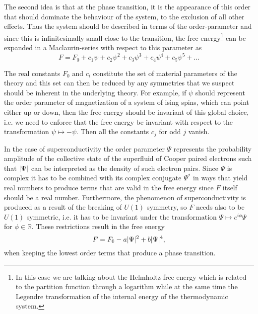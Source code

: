 The second idea is that at the phase transition, it is the appearance of this order that should dominate the behaviour
of the system, to the exclusion of all other effects. Thus the system should be described in terms of the order-parameter
and since this is infinitesimally small close to the transition, the free energy\footnote{In this case we are talking
about the Helmholtz free energy which is related to the partition function through a logarithm while at the same time
the Legendre transformation of the internal energy of the thermodynamic system.} can be expanded in a Maclaurin-series
with respect to this parameter as
\begin{equation}
    \label{eq:statMech:LandauMaclaurin}
    F = F_0 + c_1 \psi + c_2 \psi^2 + c_3 \psi^3 + c_4 \psi^4 + c_5 \psi^5 + \ldots
\end{equation}

The real constants $F_0$ and $c_i$ constitute the set of material parameters of the theory and this set can then
be reduced by any symmetries that we suspect should be inherent in the underlying theory. For example, if $\psi$
should represent the order parameter of magnetization of a system of ising spins, which can point either up or
down, then the free energy should be invariant of this global choice, i.e. we need to enforce that the free energy
be invariant with respect to the transformation $\psi \mapsto -\psi$. Then all the constants $c_j$ for odd $j$
vanish.

In the case of superconductivity the order parameter $\Psi$ represents the probability amplitude of the collective
state of the superfluid of Cooper paired electrons such that $\lvert \Psi \rvert$ can be interpreted as the density of such
electron pairs. Since $\Psi$ is complex it has to be combined with its complex conjugate $\Psi^\ast$ in ways that
yield real numbers to produce terms that are valid in the free energy since $F$ itself should be a real number.
Furthermore, the phenomenon of superconductivity is produced as a result of the breaking of $U(1)$ symmetry, so $F$
needs also to be $U(1)$ symmetric, i.e. it has to be invariant under the transformation $\Psi \mapsto e^{i\phi}\Psi$
for $\phi\in\mathbb{R}$. These restrictions result in the free energy
\begin{equation}
    \label{eq:statMech:LandauU1}
    F = F_0 - a\lvert \Psi \rvert^2 + b\lvert \Psi \rvert^4,
\end{equation}
when keeping the lowest order terms that produce a phase transition.

